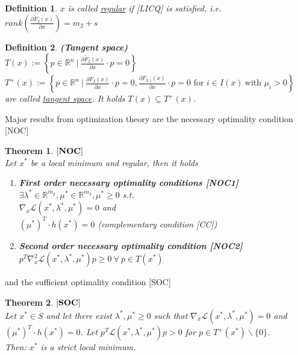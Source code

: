 \documentclass{scrartcl}[12pt, halfparskip]
\numberwithin{equation}{section}
\numberwithin{figure}{section}
\numberwithin{table}{section}
\newtheorem{Definition}{Definition}
\newtheorem{Theorem}{Theorem}
\begin{document}
\begin{Definition}
	$x$ is called \underline{regular} if [LICQ] is satisfied, i.e. $rank \left( \frac{\partial \tilde F_2(x)}{\partial x} \right) = m_2 + s$
\end{Definition}

\begin{Definition}
	\textbf{(Tangent space)} \\
	$T(x) := \left\{ p \in \mathbb{R}^n \ | \ \frac{\partial \tilde F_2(x)}{\partial x} \cdot p = 0 \right\}$ \\
	$T^+(x) := \left\{ p \in \mathbb{R}^n \ | \ \frac{\partial F_2(x)}{\partial x} \cdot p = 0, \frac{\partial F_{3,i}(x)}{\partial x} \cdot p = 0 \text{ for } i \in I(x) \ \text{with } \mu_i > 0 \right\}$ \\
	are called \underline{tangent space}. It holds $T(x) \subseteq T^+(x)$.
\end{Definition}

Major results from optimization theory are the necessary optimality condition [NOC]

\begin{Theorem}
	$[\text{\textbf{NOC}}]$ \\
	Let $x^*$ be a local minimum and regular, then it holds
	\begin{enumerate}
		\item \textbf{First order necessary optimality conditions [NOC1]} \\
		$\exists \lambda^* \in \mathbb{R}^{m_2}, \mu^* \in \mathbb{R}^{m_3}, \mu^* \ge 0$ s.t. \\
		$\nabla_x \mathcal{L}(x^*, \lambda^*, \mu^*) = 0$ and \\
		$(\mu^*)^T \cdot h(x^*) = 0$ (complementary condition [CC])
		\item \textbf{Second order necessary optimality condition [NOC2]} \\
		$p^T \nabla_x^2 \mathcal{L}(x^*, \lambda^*, \mu^*) p \ge 0 \ \forall \ p \in T(x^*)$
	\end{enumerate}
\end{Theorem}

and the sufficient optimality condition [SOC]

\begin{Theorem}
	$[\text{\textbf{SOC}}]$ \\
	Let $x^* \in S$ and let there exist $\lambda^*, \mu^* \ge 0$ such that $\nabla_x \mathcal{L}(x^*, \lambda^*, \mu^*) = 0$ and \\ $(\mu^*)^T \cdot h(x^*) = 0$. 
	Let $p^T \mathcal{L}(x^*, \lambda^*, \mu^*) p > 0$ for $p \in T^+(x^*) \backslash \{0\}$. \\
	Then: $x^*$ is a strict local minimum.
\end{Theorem}
\end{document}

